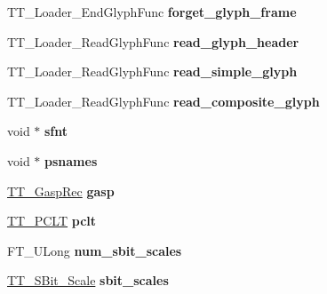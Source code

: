 \begin{DoxyCompactItemize}
\item 
\mbox{\label{struct_t_t___face_rec___ac86fbd960fe6c919eb82cd7233655894}} 
T\+T\+\_\+\+Loader\+\_\+\+End\+Glyph\+Func {\bfseries forget\+\_\+glyph\+\_\+frame}
\item 
\mbox{\label{struct_t_t___face_rec___a343db3c51a3047324fea455ac06d7cb3}} 
T\+T\+\_\+\+Loader\+\_\+\+Read\+Glyph\+Func {\bfseries read\+\_\+glyph\+\_\+header}
\item 
\mbox{\label{struct_t_t___face_rec___aa9f550ad4e10d8232cdd3427e02e7603}} 
T\+T\+\_\+\+Loader\+\_\+\+Read\+Glyph\+Func {\bfseries read\+\_\+simple\+\_\+glyph}
\item 
\mbox{\label{struct_t_t___face_rec___ac261cd70ce36c35c615fc5e2319b40c4}} 
T\+T\+\_\+\+Loader\+\_\+\+Read\+Glyph\+Func {\bfseries read\+\_\+composite\+\_\+glyph}
\item 
\mbox{\label{struct_t_t___face_rec___a4c198db893da1900ee0384969d10f9f6}} 
void $\ast$ {\bfseries sfnt}
\item 
\mbox{\label{struct_t_t___face_rec___a68cd8f2554793512af611422092b4814}} 
void $\ast$ {\bfseries psnames}
\item 
\mbox{\label{struct_t_t___face_rec___a042468253b53931f4901ac47e37fbe14}} 
\hyperlink{struct_t_t___gasp__}{T\+T\+\_\+\+Gasp\+Rec} {\bfseries gasp}
\item 
\mbox{\label{struct_t_t___face_rec___a18faed293bc94ac00fa7612b175adc0e}} 
\hyperlink{struct_t_t___p_c_l_t__}{T\+T\+\_\+\+P\+C\+LT} {\bfseries pclt}
\item 
\mbox{\label{struct_t_t___face_rec___a5437fbf3ee625e001c28ec975326922a}} 
F\+T\+\_\+\+U\+Long {\bfseries num\+\_\+sbit\+\_\+scales}
\item 
\mbox{\label{struct_t_t___face_rec___a13215cb0365ee61c889385919fbd381f}} 
\hyperlink{struct_t_t___s_bit___scale_rec__}{T\+T\+\_\+\+S\+Bit\+\_\+\+Scale} {\bfseries sbit\+\_\+scales}

\end{DoxyCompactItemize}
